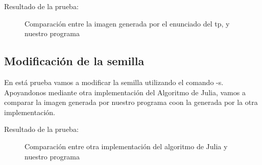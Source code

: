 \documentclass [12pt, a4paper]{article}
\begin{document}
	Resultado de la prueba:
	\begin{figure}[h]
		\centering
		\caption{Comparación entre la imagen generada por el enunciado del tp, y nuestro programa}
		\label{f:comparacion2}
	\end{figure}

	\subsection{Modificación de la semilla}
	En está prueba vamos a modificar la semilla utilizando el comando -s. Apoyandonos mediante otra implementación del Algoritmo de Julia, vamos a comparar la imagen generada por nuestro programa coon la generada por la otra implementación.
	
	Resultado de la prueba:
		\begin{figure}[h]
		\centering
		\caption{Comparación entre otra implementación del algoritmo de Julia y nuestro programa}
		\label{f:comparacion3}
	\end{figure}
	\printindex
\end{document}
